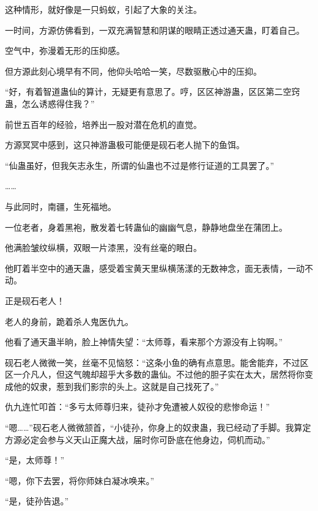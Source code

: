 \begin{this_body}
这种情形，就好像是一只蚂蚁，引起了大象的关注。

一时间，方源仿佛看到，一双充满智慧和阴谋的眼睛正透过通天蛊，盯着自己。

空气中，弥漫着无形的压抑感。

但方源此刻心境早有不同，他仰头哈哈一笑，尽数驱散心中的压抑。

“好，有着智道蛊仙的算计，无疑更有意思了。哼，区区神游蛊，区区第二空窍蛊，怎么诱惑得住我？”

前世五百年的经验，培养出一股对潜在危机的直觉。

方源冥冥中感到，这只神游蛊极可能便是砚石老人抛下的鱼饵。

“仙蛊虽好，但我矢志永生，所谓的仙蛊也不过是修行证道的工具罢了。”

……

与此同时，南疆，生死福地。

一位老者，身着黑袍，散发着七转蛊仙的幽幽气息，静静地盘坐在蒲团上。

他满脸皱纹纵横，双眼一片漆黑，没有丝毫的眼白。

他盯着半空中的通天蛊，感受着宝黄天里纵横荡漾的无数神念，面无表情，一动不动。

正是砚石老人！

老人的身前，跪着杀人鬼医仇九。

他看了通天蛊半晌，脸上神情失望：“太师尊，看来那个方源没有上钩啊。”

砚石老人微微一笑，丝毫不见恼怒：“这条小鱼的确有点意思。能舍能弃，不过区区一介凡人，但这气魄却超乎大多数的蛊仙。不过他的胆子实在太大，居然将你变成他的奴隶，惹到我们影宗的头上。这就是自己找死了。”

仇九连忙叩首：“多亏太师尊归来，徒孙才免遭被人奴役的悲惨命运！”

“嗯……”砚石老人微微颔首，“小徒孙，你身上的奴隶蛊，我已经动了手脚。我算定方源必定会参与义天山正魔大战，届时你可卧底在他身边，伺机而动。”

“是，太师尊！”

“嗯，你下去罢，将你师妹白凝冰唤来。”

“是，徒孙告退。”

\end{this_body}

